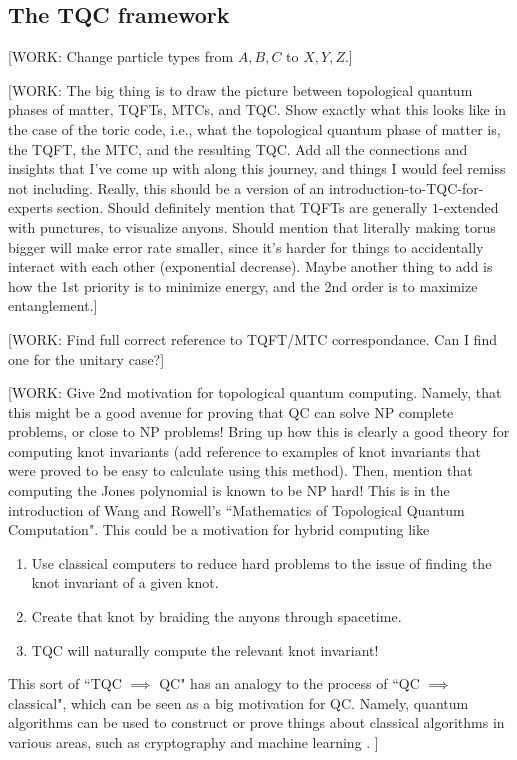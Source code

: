 \documentclass{article}
\theoremstyle{definition}
\numberwithin{figure}{section}
\begin{document}
\subsection{The TQC framework}
\label{The TQC framework}

[WORK: Change particle types from $A,B,C$ to $X,Y,Z$.]

[WORK: The big thing is to draw the picture between topological quantum phases of matter, TQFTs, MTCs, and TQC. Show exactly what this looks like in the case of the toric code, i.e., what the topological quantum phase of matter is, the TQFT, the MTC, and the resulting TQC. Add all the connections and insights that I've come up with along this journey, and things I would feel remiss not including. Really, this should be a version of an introduction-to-TQC-for-experts section. Should definitely mention that TQFTs are generally $1$-extended with punctures, to visualize anyons. Should mention that literally making torus bigger will make error rate smaller, since it's harder for things to accidentally interact with each other (exponential decrease). Maybe another thing to add is how the 1st priority is to minimize energy, and the 2nd order is to maximize entanglement.]


[WORK: Find full correct reference to TQFT/MTC correspondance. Can I find one for the unitary case?]

[WORK: Give 2nd motivation for topological quantum computing. Namely, that this might be a good avenue for proving that QC can solve NP complete problems, or close to NP problems! Bring up how this is clearly a good theory for computing knot invariants (add reference to examples of knot invariants that were proved to be easy to calculate using this method). Then, mention that computing the Jones polynomial is known to be NP hard! This is in the introduction of Wang and Rowell's ``Mathematics of Topological Quantum Computation". This could be a motivation for hybrid computing like

\begin{enumerate}
\item Use classical computers to reduce hard problems to the issue of finding the knot invariant of a given knot.
\item Create that knot by braiding the anyons through spacetime.
\item TQC will naturally compute the relevant knot invariant!
\end{enumerate}

This sort of ``TQC $\implies$ QC" has an analogy to the process of ``QC $\implies$ classical", which can be seen as a big motivation for QC. Namely, quantum algorithms can be used to construct or prove things about classical algorithms in various areas, such as cryptography \cite{regev2009lattices} and machine learning \cite{tang2019quantum}.
]
\end{document}
